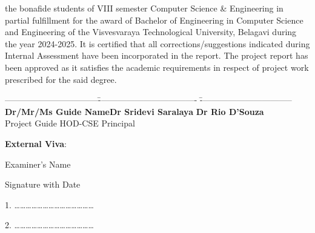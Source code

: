 \documentclass[12pt,a4paper]{report}
\begin{document}
\noindent
the bonafide students of VIII semester Computer Science \& Engineering in partial fulfillment for the award of Bachelor of Engineering in Computer Science and Engineering of the Visvesvaraya Technological University, Belagavi during the year 2024-2025. It is certified that all corrections/suggestions indicated during Internal Assessment have been incorporated in the report. The project report has been approved as it satisfies the academic requirements in respect of project work prescribed for the said degree. 

\par
\vspace{0.33in}
\begin{tabbing}
---------------------------------\hspace{0.3in}\=----------------------------------- \hspace{0.3in}\=--------------------------------- \\
\textbf{Dr/Mr/Ms Guide Name}\>\hspace{0.3in}\textbf{Dr Sridevi Saralaya }\>\hspace{0.3in}\textbf{Dr Rio D'Souza}\\
\hspace{0.5in}Project Guide\>\hspace{0.50in} HOD-CSE \>\hspace{0.6in}Principal
\end{tabbing}

\begin{center}
\large \textbf{External Viva}:
\end{center}
\begin{flushleft}
\begin{normalsize}Examiner's Name \end{normalsize}
\hspace{6.5cm}
\begin{normalsize}Signature with Date\end{normalsize}
\end{flushleft}
\vspace{0.1in}
\begin{flushleft}
1. \ldots\ldots\ldots\ldots\ldots\ldots \ldots \hspace{5.8cm}\ldots\ldots\ldots\ldots \ldots\ldots\ldots 
\par
\vspace{0.2in}	
2. \ldots\ldots\ldots\ldots\ldots\ldots \ldots \hspace{5.8cm}\ldots\ldots\ldots\ldots \ldots\ldots\ldots 
\end{flushleft}
\newpage
\end{document}
